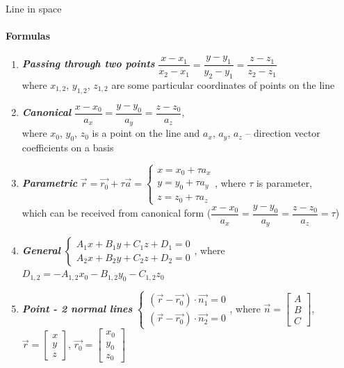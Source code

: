 \documentclass[aspectratio=169]{beamer}
\begin{document}
\begin{frame}[t]{Line in space}
    \framesubtitle{Formulas}
    \scriptsize
    \vspace{-0.4cm}
    \begin{multicols}{2}
        \begin{enumerate}
            \item \textbf{\textit{Passing through two points}} $\dfrac{x-x_1}{x_2-x_1} = \dfrac{y-y_1}{y_2-y_1}=\dfrac{z-z_1}{z_2-z_1}$\\ where $x_{1,2}$, $y_{1,2}$, $z_{1,2}$ are some particular coordinates of points on the line
            \item \textbf{\textit{Canonical}} $\dfrac{x-x_0}{a_x} = \dfrac{y-y_0}{a_y}=\dfrac{z-z_0}{a_z}$,\\ where $x_0$, $y_0$, $z_0$ is a point on the line and $a_x$, $a_y$, $a_z$ -- direction vector coefficients on a basis
            \item \textbf{\textit{Parametric}} $\vec{r} = \vec{r_0} + \tau \vec{a}=\left\{\begin{matrix} x = x_0 + \tau a_x
                          \\ y = y_0 + \tau a_y \\ z = z_0 + \tau a_z
                      \end{matrix}\right.$, where $\tau$ is parameter,\\ which can be received from canonical form ($\dfrac{x-x_0}{a_x} = \dfrac{y-y_0}{a_y} =\dfrac{z-z_0}{a_z}= \tau$)
            \item \textbf{\textit{General}} $\left\{\begin{matrix} A_1x + B_1y + C_1z + D_1 = 0
                          \\ A_2x + B_2y + C_2z + D_2 = 0
                      \end{matrix}\right.$, where \\ $D_{1,2} = -A_{1,2}x_0 - B_{1,2}y_0 - C_{1,2}z_0$
            \item \textbf{\textit{Point - 2 normal lines}} $\left\{\begin{matrix}(\vec{r} - \vec{r_0}) \cdot \vec{n_1} = 0 \\ (\vec{r} - \vec{r_0}) \cdot \vec{n_2} = 0 \end{matrix}\right.$, where $\vec{n} = \begin{bmatrix}A\\B\\C \end{bmatrix}$, $\vec{r} = \begin{bmatrix}x\\y\\z \end{bmatrix}$, $\vec{r_0} = \begin{bmatrix}x_0\\y_0\\z_0 \end{bmatrix}$

\end{enumerate}
\end{multicols}
\end{frame}
\end{document}
